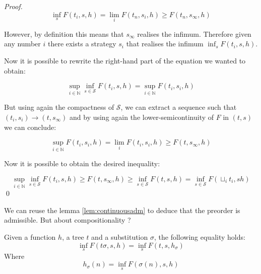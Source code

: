 \begin{ensps}
\begin{proof}
    \begin{equation*}
        \inf_s F(t_i, s, h) = \lim_i F(t_n, s_i, h) 
                            \geq F (t_n, s_\infty, h)
    \end{equation*}

    However, by definition this means that 
    $s_\infty$ realises the infimum. Therefore given any 
    number $i$ there exists a strategy $s_i$ that realises 
    the infimum $\inf_s F(t_i, s, h)$.

    Now it is possible to rewrite the right-hand part 
    of the equation we wanted to obtain:

    \begin{equation*}
        \sup_{i \in \mathbb{N}} \inf_{s \in \mathcal{S}} F(t_i,s,h) 
        = 
        \sup_{i \in \mathbb{N}}  F(t_i,s_i,h)
    \end{equation*}

    But using again the compactness of $\mathcal{S}$, we can 
    extract a sequence such that $(t_i,s_i) \longrightarrow (t,s_\infty)$
    and by using again the lower-semicontinuity of $F$ in $(t,s)$ we can 
    conclude:

    \begin{equation*}
        \sup_{i \in \mathbb{N}}  F(t_i,s_i,h) = \lim_i F(t_i, s_i, h) \geq
        F(t,s_\infty, h)
    \end{equation*}

    Now it is possible to obtain the desired inequality:

    \begin{equation*}
        \sup_{i \in \mathbb{N}} \inf_{s \in \mathcal{S}} F(t_i,s,h) 
        \geq 
        F(t,s_\infty, h)
        \geq 
        \inf_{s \in \mathcal{S}} F(t,s,h)
        = 
        \inf_{s \in \mathcal{S}} F (\sqcup_i t_i, s h)
    \end{equation*}
    \qed
\end{proof}
\end{ensps}

We can reuse the lemma \ref{lem:continuousadm} to deduce 
that the preorder is admissible. But about compositionality ?

\begin{alemma}[Decomposition]
    \label{lem:mixeddecomposition}
    Given a function $h$, a tree $t$ and a substitution $\sigma$,
    the following equality holds:
    \begin{equation*}
        \inf_s F(t\sigma ,s,h) = \inf_s F(t,s,h_\sigma)
    \end{equation*}
    Where
    \begin{equation*}
        h_\sigma (n) = \inf_s F(\sigma(n),s,h)
    \end{equation*}
\end{alemma}

